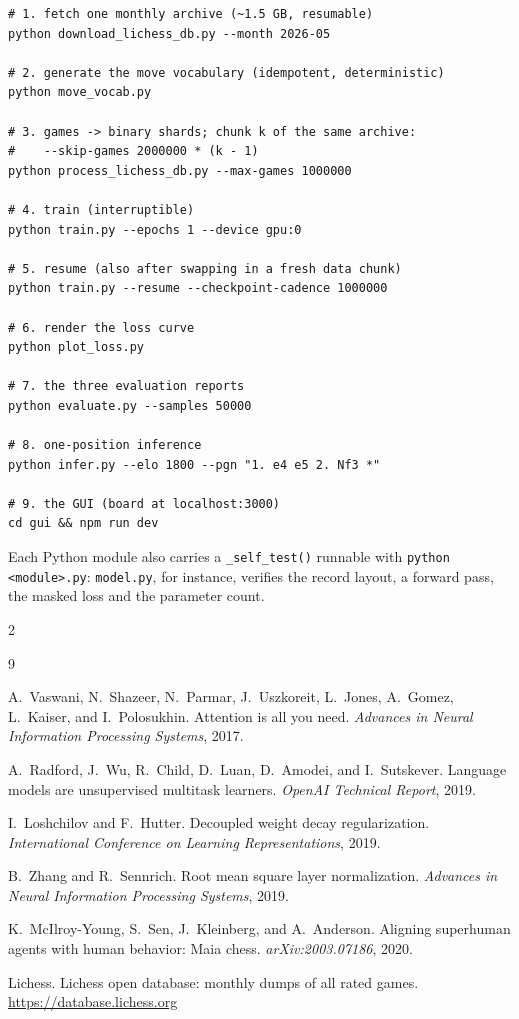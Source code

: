 \documentclass[10pt,a4paper]{article}
\newcommand{\code}[1]{\texttt{#1}}
\begin{document}
\begin{lstlisting}[style=shell, caption={End-to-end commands.}]
# 1. fetch one monthly archive (~1.5 GB, resumable)
python download_lichess_db.py --month 2026-05

# 2. generate the move vocabulary (idempotent, deterministic)
python move_vocab.py

# 3. games -> binary shards; chunk k of the same archive:
#    --skip-games 2000000 * (k - 1)
python process_lichess_db.py --max-games 1000000

# 4. train (interruptible)
python train.py --epochs 1 --device gpu:0

# 5. resume (also after swapping in a fresh data chunk)
python train.py --resume --checkpoint-cadence 1000000

# 6. render the loss curve
python plot_loss.py

# 7. the three evaluation reports
python evaluate.py --samples 50000

# 8. one-position inference
python infer.py --elo 1800 --pgn "1. e4 e5 2. Nf3 *"

# 9. the GUI (board at localhost:3000)
cd gui && npm run dev
\end{lstlisting}

Each Python module also carries a \code{\_self\_test()} runnable with
\code{python <module>.py}: \code{model.py}, for instance, verifies the
record layout, a forward pass, the masked loss and the parameter count.

\begingroup
\setlength{\multicolsep}{3pt}
\begin{multicols}{2}
\begin{thebibliography}{9}\footnotesize

A.~Vaswani, N.~Shazeer, N.~Parmar, J.~Uszkoreit, L.~Jones, A.~Gomez,
L.~Kaiser, and I.~Polosukhin.
\newblock Attention is all you need.
\newblock \emph{Advances in Neural Information Processing Systems}, 2017.

A.~Radford, J.~Wu, R.~Child, D.~Luan, D.~Amodei, and I.~Sutskever.
\newblock Language models are unsupervised multitask learners.
\newblock \emph{OpenAI Technical Report}, 2019.

I.~Loshchilov and F.~Hutter.
\newblock Decoupled weight decay regularization.
\newblock \emph{International Conference on Learning Representations}, 2019.

B.~Zhang and R.~Sennrich.
\newblock Root mean square layer normalization.
\newblock \emph{Advances in Neural Information Processing Systems}, 2019.

K.~McIlroy-Young, S.~Sen, J.~Kleinberg, and A.~Anderson.
\newblock Aligning superhuman agents with human behavior: Maia chess.
\newblock \emph{arXiv:2003.07186}, 2020.

Lichess.
\newblock Lichess open database: monthly dumps of all rated games.
\newblock \url{https://database.lichess.org}

\end{thebibliography}
\end{multicols}
\endgroup
\end{document}
